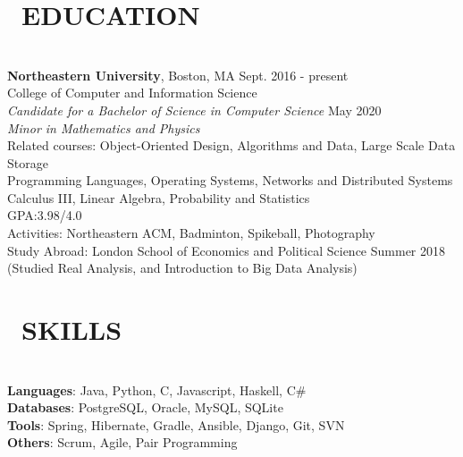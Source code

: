 \documentclass[11pt]{res}
\newcommand{\sectionunderline}{\vspace{-3mm}\hrulefill\\}
\newcommand{\listingtab}{\tabto{3.5cm}}
\newcommand{\newsect}[1]{\section{\Large \bf #1}}
\newcommand{\email}[1]{\faEnvelope\hspace{1mm} \href{mailto:#1}{#1}}
\newcommand{\phone}[1]{\faMobilePhone\hspace{1mm} #1}
\newcommand{\github}[1]{\faGit\hspace{1mm} \href{https://github.com/#1}{#1}}
\newcommand{\linkedin}[1]{\faLinkedinSquare\hspace{1mm} \href{https://linkedin.com/in/#1}{#1}}
\begin{document}
\address{
  \large\phone{(802) 503-5089}\:
  \large{$\bullet$}
  \large\email{derekpham67@gmail.com}\:
  \large{$\bullet$}
  \large\github{derekpham}\:
  \large{$\bullet$}
  \large\linkedin{derek-pham97}\\
  \normalsize Available: January - August 2019
}

\begin{resume}
  \newsect{\faGraduationCap\ EDUCATION}{
    \sectionunderline{
      {\bf Northeastern University}, Boston, MA \hfill Sept. 2016 - present\\
      College of Computer and Information Science}\\
                     {\it Candidate for a Bachelor of Science in Computer Science} \hfill May 2020\\
                     {\it Minor in Mathematics and Physics}\vspace{2mm}\\
                     Related courses:
                     \listingtab Object-Oriented Design, Algorithms and Data, Large Scale Data Storage\\
                     \listingtab Programming Languages, Operating Systems, Networks and Distributed Systems\\
                     \listingtab Calculus III, Linear Algebra, Probability and Statistics\\
                     GPA:\listingtab 3.98/4.0\\
                     Activities: \listingtab Northeastern ACM, Badminton, Spikeball, Photography\\
                     Study Abroad: \listingtab London School of Economics and Political Science \hfill Summer 2018\\
                     \listingtab (Studied Real Analysis, and Introduction to Big Data Analysis)
  }

  \newsect{\faCogs\ SKILLS}{
    \sectionunderline{
      {\bf Languages}: \listingtab Java, Python, C, Javascript, Haskell, C\#\\
      {\bf Databases}: \listingtab PostgreSQL, Oracle, MySQL, SQLite\\
      {\bf Tools}: \listingtab Spring, Hibernate, Gradle, Ansible, Django, Git, SVN\\
      {\bf Others}: \listingtab Scrum, Agile, Pair Programming
    }
  }


\end{resume}
\end{document}
